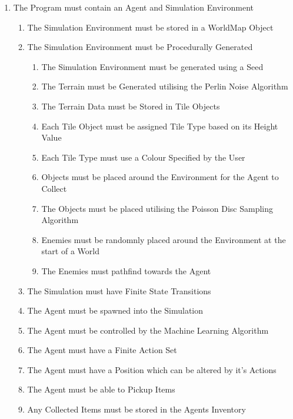\begin{flushleft}
\begin{enumerate}
                \item The Program must contain an Agent and Simulation Environment
                \begin{enumerate}
                    \item The Simulation Environment must be stored in a WorldMap Object 
                    \item The Simulation Environment must be Procedurally Generated
                    \begin{enumerate}
                        \item The Simulation Environment must be generated using a Seed
                        \item The Terrain must be Generated utilising the Perlin Noise Algorithm
                        \item The Terrain Data must be Stored in Tile Objects
                        \item Each Tile Object must be assigned Tile Type based on its Height Value
                        \item Each Tile Type must use a Colour Specified by the User
                        \item Objects must be placed around the Environment for the Agent to Collect
                        \item The Objects must be placed utilising the Poisson Disc Sampling Algorithm
                        \item Enemies must be randomnly placed around the Environment at the start of a World
                        \item The Enemies must pathfind towards the Agent
                    \end{enumerate}
                    \item The Simulation must have Finite State Transitions
                    \item The Agent must be spawned into the Simulation
                    \item The Agent must be controlled by the Machine Learning Algorithm
                    \item The Agent must have a Finite Action Set
                    \item The Agent must have a Position which can be altered by it's Actions
                    \item The Agent must be able to Pickup Items
                    \item Any Collected Items must be stored in the Agents Inventory

\end{enumerate}
\end{enumerate}
\end{flushleft}
